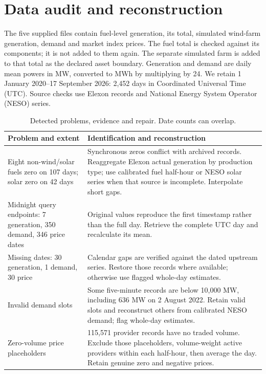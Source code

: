 \section{Data audit and reconstruction}\label{sec:data}
The five supplied files contain fuel-level generation, its total, simulated
wind-farm generation, demand and market index prices. The fuel total is
checked against its components; it is not added to them again. The separate
simulated farm is added to that total as the declared asset boundary.
Generation and demand are daily mean powers in MW, converted to MWh by
multiplying by 24. We retain 1 January 2020--17 September 2026: 2,452 days
in Coordinated Universal Time (UTC). Source checks use Elexon records and
National Energy System Operator (NESO) series.

\begin{table}[H]
\centering\small
\caption{Detected problems, evidence and repair. Date counts can overlap.}
\begin{tabularx}{\linewidth}{@{}P{.27\linewidth}Y@{}}
\toprule
Problem and extent & Identification and reconstruction \\
\midrule
Eight non-wind/solar fuels zero on 107 days; solar zero on 42 days &
Synchronous zeros conflict with archived records. Reaggregate Elexon actual
generation by production type; use calibrated fuel half-hour or NESO solar
series when that source is incomplete. Interpolate short gaps. \\
Midnight query endpoints: 7 generation, 350 demand, 346 price dates &
Original values reproduce the first timestamp rather than the full day.
Retrieve the complete UTC day and recalculate its mean. \\
Missing dates: 30 generation, 1 demand, 30 price &
Calendar gaps are verified against the dated upstream series. Restore those
records where available; otherwise use flagged whole-day estimates. \\
Invalid demand slots &
Some five-minute records are below 10,000 MW, including 636 MW on 2 August
2022. Retain valid slots and reconstruct others
from calibrated NESO demand; flag whole-day estimates. \\
Zero-volume price placeholders &
115,571 provider records have no traded volume. Exclude those placeholders,
volume-weight active providers within each half-hour, then average the day.
Retain genuine zero and negative prices. \\
\bottomrule
\end{tabularx}
\label{tab:repair}
\end{table}

